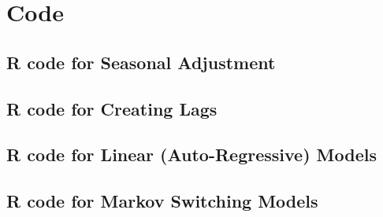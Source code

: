 \documentclass[12pt,a4paper,oneside]{book}
\begin{document}
\chapter*{Code}
\section*{R code for Seasonal Adjustment}


\section*{R code for Creating Lags}


\section*{R code for Linear (Auto-Regressive) Models}


\section*{R code for Markov Switching Models}

\newpage
\end{document}
